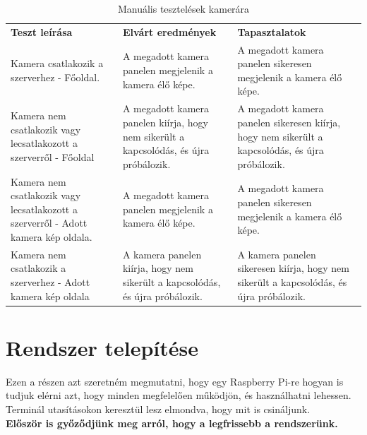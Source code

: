 \documentclass[
]{thesis-ekf}
\theoremstyle{definition}
\theoremstyle{remark}
\begin{document}
\begin{table}
	\begin{tabular}{|p{}|p{}|p{}|}
		\hline
		\rowcolor[HTML]{C0C0C0} 
		{\color[HTML]{333333} \textbf{Teszt leírása}} &
		{\color[HTML]{333333} \textbf{Elvárt eredmények}} &
		{\color[HTML]{333333} \textbf{Tapasztalatok}}
		\\
		\rowcolor[HTML]{EFEFEF} 
		Kamera csatlakozik a szerverhez - Főoldal. &
		
		A megadott kamera panelen megjelenik a kamera élő képe. &
		
		A megadott kamera panelen sikeresen megjelenik a kamera élő képe.
		\\
		Kamera nem csatlakozik vagy lecsatlakozott a szerverről - Főoldal &
		
		A megadott kamera panelen kiírja, hogy nem sikerült a kapcsolódás, és újra próbálozik. &
		
		A megadott kamera panelen sikeresen kiírja, hogy nem sikerült a kapcsolódás, és újra próbálozik.
		\\
		\rowcolor[HTML]{EFEFEF} 
		Kamera nem csatlakozik vagy lecsatlakozott a szerverről - Adott kamera kép oldala. &
		
		A megadott kamera panelen megjelenik a kamera élő képe. &
		
		A megadott kamera panelen sikeresen megjelenik a kamera élő képe.
		\\
		Kamera nem csatlakozik a szerverhez - Adott kamera kép oldala &
		
		A kamera panelen kiírja, hogy nem sikerült a kapcsolódás, és újra próbálozik. &
		
		A kamera panelen sikeresen kiírja, hogy nem sikerült a kapcsolódás, és újra próbálozik.
		\\ \hline
	\end{tabular}
	\caption{Manuális tesztelések kamerára}
	\label{camera-test-table}
\end{table}

	
	\chapter{Rendszer telepítése}
	Ezen a részen azt szeretném megmutatni, hogy egy Raspberry Pi-re hogyan is tudjuk elérni azt, hogy minden megfelelően működjön, és használhatni lehessen. Terminál utasításokon keresztül lesz elmondva, hogy mit is csináljunk.\\
	\textbf{Először is győződjünk meg arról, hogy a legfrissebb a rendszerünk.}
	
\end{document}
